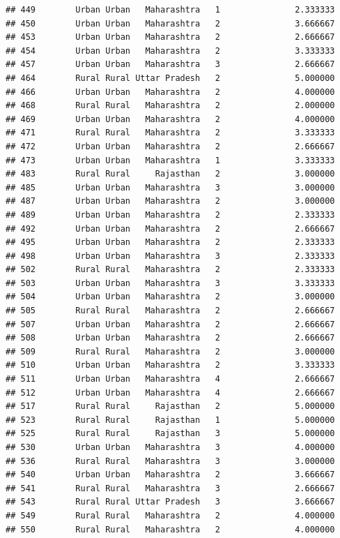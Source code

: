 \documentclass[
]{article}
\begin{document}
\begin{verbatim}
## 449        Urban Urban   Maharashtra   1               2.333333
## 450        Urban Urban   Maharashtra   2               3.666667
## 453        Urban Urban   Maharashtra   2               2.666667
## 454        Urban Urban   Maharashtra   2               3.333333
## 457        Urban Urban   Maharashtra   3               2.666667
## 464        Rural Rural Uttar Pradesh   2               5.000000
## 466        Urban Urban   Maharashtra   2               4.000000
## 468        Rural Rural   Maharashtra   2               2.000000
## 469        Urban Urban   Maharashtra   2               4.000000
## 471        Rural Rural   Maharashtra   2               3.333333
## 472        Urban Urban   Maharashtra   2               2.666667
## 473        Urban Urban   Maharashtra   1               3.333333
## 483        Rural Rural     Rajasthan   2               3.000000
## 485        Urban Urban   Maharashtra   3               3.000000
## 487        Urban Urban   Maharashtra   2               3.000000
## 489        Urban Urban   Maharashtra   2               2.333333
## 492        Urban Urban   Maharashtra   2               2.666667
## 495        Urban Urban   Maharashtra   2               2.333333
## 498        Urban Urban   Maharashtra   3               2.333333
## 502        Rural Rural   Maharashtra   2               2.333333
## 503        Urban Urban   Maharashtra   3               3.333333
## 504        Urban Urban   Maharashtra   2               3.000000
## 505        Rural Rural   Maharashtra   2               2.666667
## 507        Urban Urban   Maharashtra   2               2.666667
## 508        Urban Urban   Maharashtra   2               2.666667
## 509        Rural Rural   Maharashtra   2               3.000000
## 510        Urban Urban   Maharashtra   2               3.333333
## 511        Urban Urban   Maharashtra   4               2.666667
## 512        Urban Urban   Maharashtra   4               2.666667
## 517        Rural Rural     Rajasthan   2               5.000000
## 523        Rural Rural     Rajasthan   1               5.000000
## 525        Rural Rural     Rajasthan   3               5.000000
## 530        Urban Urban   Maharashtra   3               4.000000
## 536        Rural Rural   Maharashtra   3               3.000000
## 540        Urban Urban   Maharashtra   2               3.666667
## 541        Rural Rural   Maharashtra   3               2.666667
## 543        Rural Rural Uttar Pradesh   3               3.666667
## 549        Rural Rural   Maharashtra   2               4.000000
## 550        Rural Rural   Maharashtra   2               4.000000

\end{verbatim}
\end{document}
